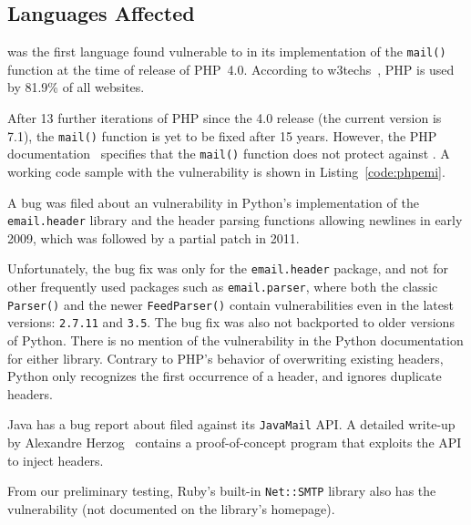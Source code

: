 \subsection{Languages Affected}
\vspace{-1.5ex}
\label{languages}
 was the first language found vulnerable to \ehi in its implementation of the \texttt{mail()} function at the time of release of PHP~4.0. According to w3techs~\cite{W3techs}, PHP is used by 81.9\% of all websites.

After 13 further iterations of PHP since the 4.0 release (the current
version is 7.1), the \texttt{mail()} function is yet to be fixed after
15 years. However, the PHP documentation~\cite{PHPDocs} specifies that the \texttt{mail()} function does not protect against \ehi.
A working code sample with the vulnerability is shown in  Listing~\ref{code:phpemi}.

\begin{sloppypar}
A bug was filed about an \ehi vulnerability in Python's implementation of the \texttt{email.header} library and the header parsing functions allowing newlines in early 2009, which was followed by a partial patch in 2011.
\end{sloppypar}

Unfortunately, the bug fix was only for the \texttt{email.header} package, and not for other frequently used packages such as \texttt{email.parser}, where both the classic \texttt{Parser()} and the newer \texttt{FeedParser()} contain \ehi vulnerabilities even in the latest versions: \texttt{2.7.11} and \texttt{3.5}. The bug fix was also not backported to older versions of Python.
There is no mention of the vulnerability in the Python documentation for either library. Contrary to PHP's behavior of overwriting existing headers, Python only recognizes the first occurrence of a header, and ignores duplicate headers.


%

Java has a bug report about \ehi filed against its \texttt{JavaMail} API. A detailed write-up by Alexandre Herzog~\cite{Herzog.2014} contains a proof-of-concept program that exploits the API to inject headers.

From our preliminary testing, Ruby's built-in \texttt{Net::SMTP} library also has the vulnerability (not documented on the library's homepage).
%


